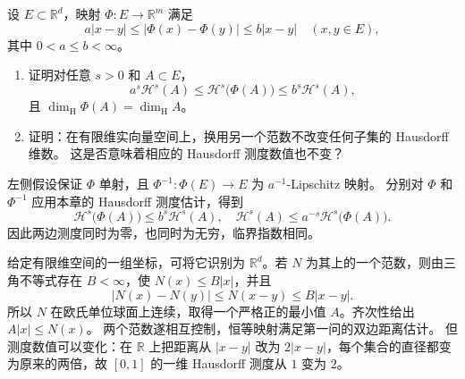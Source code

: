 \begin{exercise}\label{b1:ex:15-bilipschitz-norms}
设 \(E\subset\mathbb R^d\)，映射 \(\Phi:E\to\mathbb R^m\) 满足
\[
 a|x-y|\le|\Phi(x)-\Phi(y)|\le b|x-y|
 \quad(x,y\in E),
\]
其中 \(0<a\le b<\infty\)。
\begin{enumerate}
\item\label{b1:item:15-bilipschitz-measure}
证明对任意 \(s>0\) 和 \(A\subset E\)，
\[
 a^s\mathcal H^s(A)\le\mathcal H^s\bigl(\Phi(A)\bigr)
 \le b^s\mathcal H^s(A),
\]
且 \(\dim_{\mathrm H}\Phi(A)=\dim_{\mathrm H}A\)。
\item\label{b1:item:15-norm-independent}
证明：在有限维实向量空间上，换用另一个范数不改变任何子集的 Hausdorff 维数。
这是否意味着相应的 Hausdorff 测度数值也不变？
\end{enumerate}
\end{exercise}
\begin{solution}
左侧假设保证 \(\Phi\) 单射，且 \(\Phi^{-1}:\Phi(E)\to E\) 为 \(a^{-1}\)-Lipschitz 映射。
分别对 \(\Phi\) 和 \(\Phi^{-1}\) 应用本章的 Hausdorff 测度估计，得到
\[
 \mathcal H^s\bigl(\Phi(A)\bigr)\le b^s\mathcal H^s(A),
 \quad
 \mathcal H^s(A)\le a^{-s}\mathcal H^s\bigl(\Phi(A)\bigr).
\]
因此两边测度同时为零，也同时为无穷，临界指数相同。

给定有限维空间的一组坐标，可将它识别为 \(\mathbb R^d\)。若 \(N\) 为其上的一个范数，则由三角不等式存在 \(B<\infty\)，使 \(N(x)\le B|x|\)，并且
\[
 |N(x)-N(y)|\le N(x-y)\le B|x-y|.
\]
所以 \(N\) 在欧氏单位球面上连续，取得一个严格正的最小值 \(A\)。齐次性给出 \(A|x|\le N(x)\)。
两个范数遂相互控制，恒等映射满足第一问的双边距离估计。
但测度数值可以变化：在 \(\mathbb R\) 上把距离从 \(|x-y|\) 改为 \(2|x-y|\)，每个集合的直径都变为原来的两倍，故 \([0,1]\) 的一维 Hausdorff 测度从 \(1\) 变为 \(2\)。
\end{solution}

